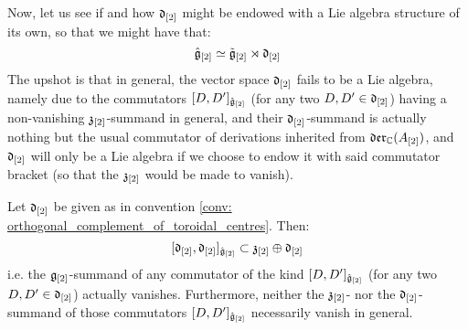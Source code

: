         Now, let us see if and how $\mathfrak{d}_{[2]}$ might be endowed with a Lie algebra structure of its own, so that we might have that:
            $$\hat{\mathfrak{g}}_{[2]} \simeq \tilde{\mathfrak{g}}_{[2]} \rtimes \mathfrak{d}_{[2]}$$
        The upshot is that in general, the vector space $\mathfrak{d}_{[2]}$ fails to be a Lie algebra, namely due to the commutators $[D, D']_{\hat{\mathfrak{g}}_{[2]}}$ (for any two $D, D' \in \mathfrak{d}_{[2]}$) having a non-vanishing $\mathfrak{z}_{[2]}$-summand in general, and their $\mathfrak{d}_{[2]}$-summand is actually nothing but the usual commutator of derivations inherited from $\mathfrak{der}_{\mathbb{C}}(A_{[2]})$, and $\mathfrak{d}_{[2]}$ will only be a Lie algebra if we choose to endow it with said commutator bracket (so that the $\mathfrak{z}_{[2]}$ would be made to vanish). 
        
        \begin{proposition} \label{prop: lie_bracket_on_orthogonal_complement_of_toroidal_centre}
            Let $\mathfrak{d}_{[2]}$ be given as in convention \ref{conv: orthogonal_complement_of_toroidal_centres}. Then:
                $$[ \mathfrak{d}_{[2]}, \mathfrak{d}_{[2]} ]_{\hat{\mathfrak{g}}_{[2]}} \subset \mathfrak{z}_{[2]} \oplus \mathfrak{d}_{[2]}$$
            i.e. the $\mathfrak{g}_{[2]}$-summand of any commutator of the kind $[D, D']_{\hat{\mathfrak{g}}_{[2]}}$ (for any two $D, D' \in \mathfrak{d}_{[2]}$) actually vanishes. Furthermore, neither the $\mathfrak{z}_{[2]}$- nor the $\mathfrak{d}_{[2]}$-summand of those commutators $[D, D']_{\hat{\mathfrak{g}}_{[2]}}$ necessarily vanish in general. 
        \end{proposition}
